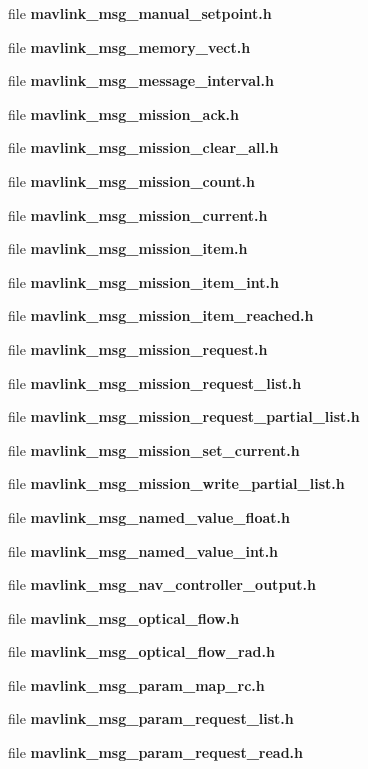\begin{DoxyCompactItemize}
\item 
file \textbf{ mavlink\+\_\+msg\+\_\+manual\+\_\+setpoint.\+h}
\item 
file \textbf{ mavlink\+\_\+msg\+\_\+memory\+\_\+vect.\+h}
\item 
file \textbf{ mavlink\+\_\+msg\+\_\+message\+\_\+interval.\+h}
\item 
file \textbf{ mavlink\+\_\+msg\+\_\+mission\+\_\+ack.\+h}
\item 
file \textbf{ mavlink\+\_\+msg\+\_\+mission\+\_\+clear\+\_\+all.\+h}
\item 
file \textbf{ mavlink\+\_\+msg\+\_\+mission\+\_\+count.\+h}
\item 
file \textbf{ mavlink\+\_\+msg\+\_\+mission\+\_\+current.\+h}
\item 
file \textbf{ mavlink\+\_\+msg\+\_\+mission\+\_\+item.\+h}
\item 
file \textbf{ mavlink\+\_\+msg\+\_\+mission\+\_\+item\+\_\+int.\+h}
\item 
file \textbf{ mavlink\+\_\+msg\+\_\+mission\+\_\+item\+\_\+reached.\+h}
\item 
file \textbf{ mavlink\+\_\+msg\+\_\+mission\+\_\+request.\+h}
\item 
file \textbf{ mavlink\+\_\+msg\+\_\+mission\+\_\+request\+\_\+list.\+h}
\item 
file \textbf{ mavlink\+\_\+msg\+\_\+mission\+\_\+request\+\_\+partial\+\_\+list.\+h}
\item 
file \textbf{ mavlink\+\_\+msg\+\_\+mission\+\_\+set\+\_\+current.\+h}
\item 
file \textbf{ mavlink\+\_\+msg\+\_\+mission\+\_\+write\+\_\+partial\+\_\+list.\+h}
\item 
file \textbf{ mavlink\+\_\+msg\+\_\+named\+\_\+value\+\_\+float.\+h}
\item 
file \textbf{ mavlink\+\_\+msg\+\_\+named\+\_\+value\+\_\+int.\+h}
\item 
file \textbf{ mavlink\+\_\+msg\+\_\+nav\+\_\+controller\+\_\+output.\+h}
\item 
file \textbf{ mavlink\+\_\+msg\+\_\+optical\+\_\+flow.\+h}
\item 
file \textbf{ mavlink\+\_\+msg\+\_\+optical\+\_\+flow\+\_\+rad.\+h}
\item 
file \textbf{ mavlink\+\_\+msg\+\_\+param\+\_\+map\+\_\+rc.\+h}
\item 
file \textbf{ mavlink\+\_\+msg\+\_\+param\+\_\+request\+\_\+list.\+h}
\item 
file \textbf{ mavlink\+\_\+msg\+\_\+param\+\_\+request\+\_\+read.\+h}

\end{DoxyCompactItemize}
